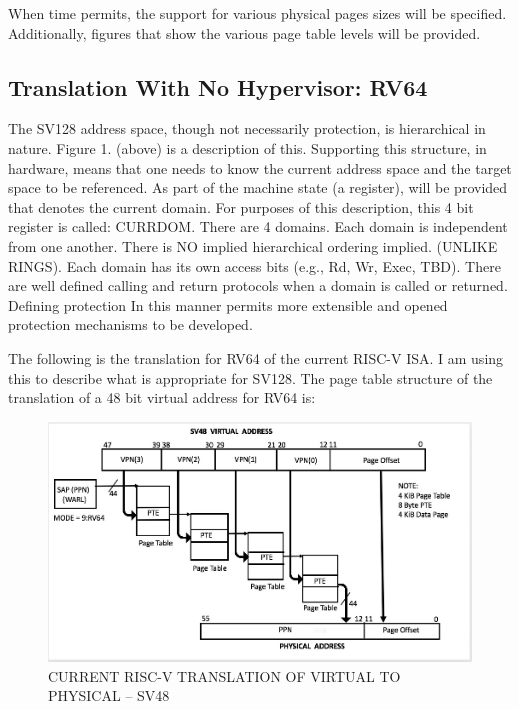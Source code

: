 \documentclass{article}
\begin{document}
When time permits,  the support for various   physical pages sizes will be specified.  Additionally, figures that show the various  page table levels will be provided.

\subsection{Translation With No Hypervisor: RV64}

The SV128 address space, though not necessarily protection, is hierarchical in nature. Figure 1.  (above) is a description of this.  Supporting this structure,  in hardware,  means that one needs to know the current address space and the  target space to be referenced. As part of the machine state (a register),  will be provided that denotes the current domain. For purposes of this description,  this 4 bit register is called: CURRDOM.   There are 4 domains.  Each domain is independent from one another.  There is NO implied hierarchical  ordering implied. (UNLIKE  RINGS).  Each domain has its own access bits (e.g., Rd, Wr, Exec, TBD). There are well defined calling and return protocols when a domain is called or returned.  Defining protection In this manner permits more extensible and opened protection mechanisms to be developed.  

The following is the  translation for RV64 of the current RISC-V ISA.  I am using this to describe what is appropriate for SV128.   The page table structure of the translation of a 48 bit virtual address for RV64 is:


\begin{figure}[h]
\includegraphics[scale=.4]{figures/figure4_sv48_translation.jpg}
\caption{CURRENT RISC-V TRANSLATION OF VIRTUAL TO PHYSICAL – SV48}
\end{figure}
\end{document}
